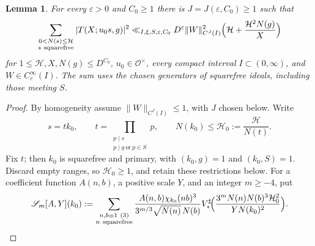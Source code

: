 \documentclass[11pt,a4paper]{article}
\numberwithin{equation}{section}
\numberwithin{figure}{section}
\newtheorem{lemma}[theorem]{Lemma}
\theoremstyle{definition}
\theoremstyle{remark}
\newcommand{\OO}{\mathcal O}
\begin{document}
\begin{lemma}\label{lem:squarefree-completed}
For every $\varepsilon>0$ and $C_0\ge1$ there is
$J=J(\varepsilon,C_0)\ge1$ such that
\begin{equation}\label{eq:squarefree-completed}
 \sum_{\substack{0<N(s)\le\mathcal H\\s\ {\rm squarefree}}}
 |T(X;u_0s,g)|^2
 \ll_{I,\xi,S,\varepsilon,C_0}D^\varepsilon\|W\|_{C^J(I)}^2
 \Bigl(\mathcal H+\frac{\mathcal H^2N(g)}X\Bigr)
\end{equation}
for $1\le\mathcal H,X,N(g)\le D^{C_0}$, $u_0\in\OO^\times$,
every compact interval $I\subset(0,\infty)$, and $W\in C_c^\infty(I)$.
The sum uses the chosen generators of squarefree ideals, including
those meeting $S$.
\end{lemma}
\begin{proof}
By homogeneity assume $\|W\|_{C^J(I)}\le1$, with $J$ chosen below.
Write
\[
 s=t k_0,\qquad
 t=\prod_{\substack{p\mid s\\p\mid g\ \text{or}\ p\in S}}p,\qquad
 N(k_0)\le\mathcal H_0:=\frac{\mathcal H}{N(t)}.
\]
Fix $t$; then $k_0$ is squarefree and primary, with
$(k_0,g)=1$ and $(k_0,S)=1$. Discard empty ranges, so
$\mathcal H_0\ge1$, and retain these restrictions below.
For a coefficient function $A(n,b)$, a positive scale $Y$, and an integer $m\ge-4$, put
\begin{equation}\label{eq:prepared-theta-sum}
 \mathscr S_m[A,Y](k_0):=
 \sum_{\substack{n,b\equiv1\ (3)\\n\ {\rm squarefree}}}
 \frac{A(n,b)\chi_{k_0}(nb)^3}{3^{m/3}\sqrt{N(n)}\,N(b)}
 V_*^\sharp\!\Bigl(\frac{3^mN(n)N(b)^3\mathcal H_0^2}
 {YN(k_0)^2}\Bigr).
\end{equation}


\end{proof}
\end{document}
